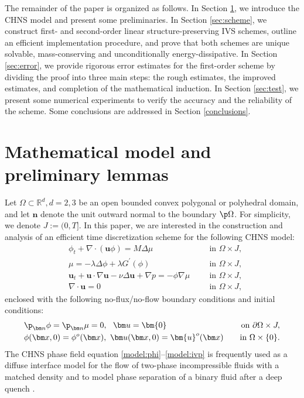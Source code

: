The remainder of the paper is organized as follows. In Section \ref{equivalent_eq}, we introduce the CHNS model and present some preliminaries. In Section \ref{sec:scheme}, we construct first- and second-order linear structure-preserving IVS schemes, outline an efficient implementation procedure, and prove that both schemes are unique solvable,  mass-conserving and unconditionally energy-dissipative. In Section \ref{sec:error}, we provide rigorous error estimates for the first-order scheme by dividing the proof into three main steps: the rough estimates, the improved estimates, and completion of the mathematical induction. In Section \ref{sec:test}, we present some numerical experiments to verify the accuracy and the reliability of the scheme. Some conclusions are addressed in Section \ref{conclusions}.

\section{Mathematical model and preliminary lemmas}\label{equivalent_eq}
Let $\Omega \subset \mathbb{R}^d, d=2,3$ be an open bounded convex polygonal or polyhedral domain, and let $\bm n$ denote the unit outward normal to the boundary $\p \Omega$. For simplicity, we denote $J:=(0,T]$. In this paper, we are interested in the construction and analysis of an efficient time discretization scheme for the following CHNS  model:
\begin{align}
	& \phi_t+ \nabla \cdot (\bm u  \phi)=M \Delta \mu 
    	&&\ \ \text { in } \Omega \times J, \label{model:phi} \\
	& \mu=- \lambda \Delta \phi+ \lambda G^{\prime}(\phi) 
	 &&\ \ \text { in } \Omega \times J,  \label{model:mu}\\
	&  \bm u_t+\bm u \cdot \nabla \bm u  -\nu \Delta \bm u+\nabla p =- \phi \nabla \mu
	 &&\ \  \text { in } \Omega \times J, \label{model:u} \\
	& \nabla \cdot \bm u=0  
	 &&\ \  \text { in } \Omega \times J, \label{model:div} 
\end{align}
enclosed with the following no-flux/no-flow boundary conditions and initial conditions:
\begin{align}
	& \p_{\bm n} \phi=\p_{\bm n} \mu=0,~~ \bm u=\bm{0}    &\ \  \text { on } \partial \Omega \times J, \label{model:boundary}\\        
	&\phi(\bm x ,0)=\phi^o(\bm x),  ~ \bm u(\bm x ,0)=\bm{u}^o(\bm x)  & \ \  \text { in } \Omega \times \{0\}. \label{model:ivp}
\end{align}
The CHNS phase field equation \eqref{model:phi}--\eqref{model:ivp} is frequently used as a diffuse interface model for the flow of two-phase incompressible fluids with a matched density \cite{gurtin1996two} and to model phase separation of a binary fluid after a deep quench \cite{anderson1998diffuse}. 

